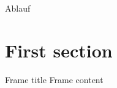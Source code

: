 \documentclass[aspectratio=43]{beamer}		%
\begin{document}
     \frame[plain]{\titlepage}
  
    \begin{frame}{Ablauf}
        \tableofcontents
    \end{frame}
  
    \section{First section}
    \begin{frame}{Frame title}
        Frame content
    \end{frame}
\end{document}
